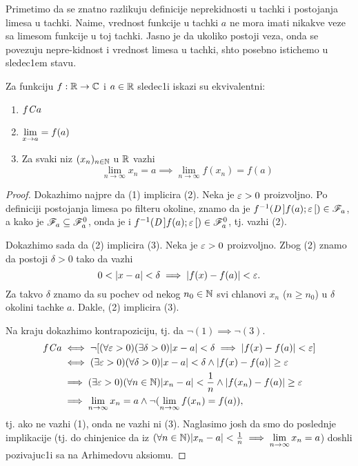 \documentclass[../maing.tex]{subfiles}
\begin{document}
    Primetimo da se znatno razlikuju definicije neprekidnosti u tachki i postojanja limesa u tachki. Naime, vrednost funkcije u tachki $a$ ne mora imati nikakve veze sa limesom funkcije u toj tachki. Jasno je da ukoliko postoji veza, onda se povezuju nepre-kidnost i vrednost limesa u tachki, shto posebno istichemo u sledec1em stavu.
    \begin{st}
     Za funkciju $f:\mathbb{R} \to \mathbb{C}$ i $a\in \mathbb{R}$ sledec1i iskazi su ekvivalentni:
\begin{enumerate}
    \item $f\mathit{C} a$
    \item $\displaystyle{\lim_{x \to a}=f(a)}$
    \item Za svaki niz $(x_n)_{n\in \mathbb{N}}$ u $\mathbb{R}$ vazhi \[\lim_{n \to \infty}x_n=a \implies \lim_{n \to \infty}f(x_n)=f(a) \]
\end{enumerate}
        \end{st}
    \begin{proof}
        Dokazhimo najpre da (1) implicira (2). Neka je $\varepsilon>0$ proizvoljno.
	Po definiciji postojanja limesa po filteru okoline, znamo da je $f^{-1}(\mathit{D}\,]f(a);\varepsilon\,[) \in \mathscr{F}_a$,
	a kako je $\mathscr{F}_a\subseteq \mathscr{F}_a^0$, onda je i  $f^{-1}(\mathit{D}\,]f(a);\varepsilon\,[) \in \mathscr{F}_a^0$, tj. vazhi (2).

        Dokazhimo sada da (2) implicira (3). Neka je $\varepsilon>0$ proizvoljno.
	Zbog (2) znamo da postoji $\delta>0$ tako da vazhi $$0<|x-a|<\delta\implies |f(x)-f(a)|<\eps.$$ 
	Za takvo $\delta$ znamo da su pochev od nekog $n_0 \in \mathbb{N}$ svi chlanovi $x_n$ ($n\geq n_0$) u $\delta$ okolini tachke $a$. Dakle, (2) implicira (3).

        Na kraju dokazhimo kontrapoziciju, tj. da $\neg(1)\implies\neg(3)$. 
        \begin{align*}
            f\mathit{C} a &\iff \neg[(\forall \varepsilon >0)(\exists \delta > 0)|x-a|<\delta \implies |f(x)-f(a)|<\varepsilon]\\
                      &\iff (\exists \varepsilon >0)(\forall \delta > 0)|x-a|<\delta \land |f(x)-f(a)|\geq\varepsilon\\
                      &\implies (\exists \varepsilon >0)(\forall n \in \mathbb{N})|x_n-a|<\frac{1}{n} \land |f(x_n)-f(a)|\geq\varepsilon\\
                      &\implies \lim_{n\to\infty}x_n=a \land \neg(\lim_{n\to\infty}f(x_n)=f(a)),
        \end{align*}
        tj. ako ne vazhi (1), onda ne vazhi ni (3). Naglasimo josh da smo do poslednje implikacije
	(tj. do chinjenice da iz $(\forall n \in \mathbb{N})|x_n-a|<\frac{1}{n} \implies \displaystyle{\lim_{n\to \infty}x_n=a}$) doshli pozivajuc1i sa na Arhimedovu aksiomu.
    \end{proof} 
    
\end{document}
